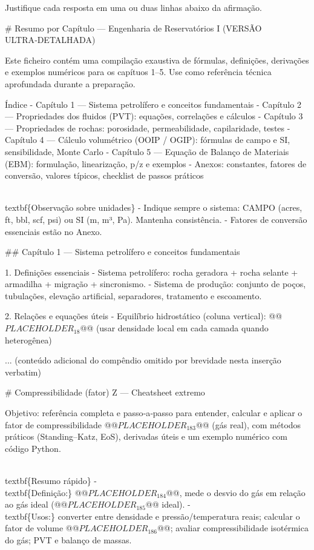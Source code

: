 \documentclass[11pt,a4paper]{article}
\begin{document}
\begin{enumerate}
{Justifique cada resposta em uma ou duas linhas abaixo da afirmação.

# Resumo por Capítulo — Engenharia de Reservatórios I (VERSÃO ULTRA‑DETALHADA)

Este ficheiro contém uma compilação exaustiva de fórmulas, definições, derivações e exemplos numéricos para os capítuos 1–5. Use como referência técnica aprofundada durante a preparação.

Índice
- Capítulo 1 — Sistema petrolífero e conceitos fundamentais
- Capítulo 2 — Propriedades dos fluidos (PVT): equações, correlações e cálculos
- Capítulo 3 — Propriedades de rochas: porosidade, permeabilidade, capilaridade, testes
- Capítulo 4 — Cálculo volumétrico (OOIP / OGIP): fórmulas de campo e SI, sensibilidade, Monte Carlo
- Capítulo 5 — Equação de Balanço de Materiais (EBM): formulação, linearização, p/z e exemplos
- Anexos: constantes, fatores de conversão, valores típicos, checklist de passos práticos


\\textbf\{Observação sobre unidades\}
- Indique sempre o sistema: CAMPO (acres, ft, bbl, scf, psi) ou SI (m, m³, Pa). Mantenha consistência.
- Fatores de conversão essenciais estão no Anexo.


## Capítulo 1 — Sistema petrolífero e conceitos fundamentais

1. Definições essenciais
- Sistema petrolífero: rocha geradora + rocha selante + armadilha + migração + sincronismo. 
- Sistema de produção: conjunto de poços, tubulações, elevação artificial, separadores, tratamento e escoamento.

2. Relações e equações úteis
- Equilíbrio hidrostático (coluna vertical):
@@$PLACEHOLDER_{18}$@@
(usar densidade local em cada camada quando heterogênea)

... (conteúdo adicional do compêndio omitido por brevidade nesta inserção verbatim)


# Compressibilidade (fator) Z — Cheatsheet extremo

Objetivo: referência completa e passo‑a‑passo para entender, calcular e aplicar o fator de compressibilidade @@$PLACEHOLDER_{183}$@@ (gás real), com métodos práticos (Standing–Katz, EoS), derivadas úteis e um exemplo numérico com código Python.


\\textbf\{Resumo rápido\}
- \\textbf\{Definição:\} @@$PLACEHOLDER_{184}$@@, mede o desvio do gás em relação ao gás ideal (@@$PLACEHOLDER_{185}$@@ ideal).
- \\textbf\{Usos:\} converter entre densidade e pressão/temperatura reais; calcular o fator de volume @@$PLACEHOLDER_{186}$@@; avaliar compressibilidade isotérmica do gás; PVT e balanço de massas.


}
\end{enumerate}
\end{document}
